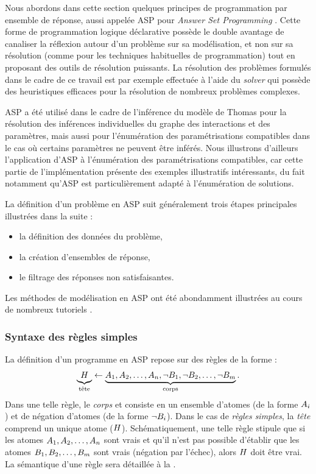 Nous abordons dans cette section quelques principes de programmation par ensemble de réponse,
aussi appelée ASP pour \textit{Answer Set Programming} \cite{Baral03}.
Cette forme de programmation logique déclarative possède le double avantage de
canaliser la réflexion autour d'un problème sur sa modélisation,
et non sur sa résolution (comme pour les techniques habituelles de programmation)
tout en proposant des outils de résolution puissants.
La résolution des problèmes formulés dans le cadre de ce travail
est par exemple effectuée à l'aide du \textit{solver}  \cite{gekakasc14b}
qui possède des heuristiques efficaces pour la résolution de nombreux
problèmes complexes.

ASP a été utilisé dans le cadre de l'inférence du modèle de Thomas
pour la résolution des inférences individuelles
du graphe des interactions et des paramètres, mais aussi pour l'énumération des paramétrisations
compatibles dans le cas où certains paramètres ne peuvent être inférés.
Nous illustrons d'ailleurs l'application d'ASP à l'énumération des paramétrisations
compatibles, car cette partie de l'implémentation présente des exemples illustratifs
intéressants, du fait notamment qu'ASP est particulièrement adapté à l'énumération
de solutions.

La définition d'un problème en ASP suit généralement trois étapes principales
illustrées dans la suite :
\begin{itemize}
  \item la définition des données du problème,
  \item la création d'ensembles de réponse,
  \item le filtrage des réponses non satisfaisantes.
\end{itemize}
Les méthodes de modélisation en ASP ont été abondamment illustrées
au cours de nombreux tutoriels \cite{gebser13}.



\subsubsection{Syntaxe des règles simples}

La définition d'un programme en ASP repose sur des règles de la forme :
\begin{align*}
  \underbrace{{\ }H_{\ }}_{\text{tête}} \leftarrow \underbrace{A_1, A_2, \dots,
  A_n, \neg B_1, \neg B_2, \dots, \neg B_m}_{\text{corps}}.
\end{align*}
Dans une telle règle, le \emph{corps} et consiste en un ensemble d'atomes
(de la forme $A_i$) et de négation d'atomes (de la forme $\neg B_i$).
Dans le cas de \emph{règles simples}, la \emph{tête} comprend un unique atome ($H$).
Schématiquement,
une telle règle stipule que si les atomes $A_1, A_2, \dots, A_n$
sont vrais et qu'il n'est pas possible d'établir que les atomes
$B_1, B_2, \dots, B_m$ sont vrais (négation par l'échec),
alors $H$ doit être vrai.
La sémantique d'une règle sera détaillée à la .

